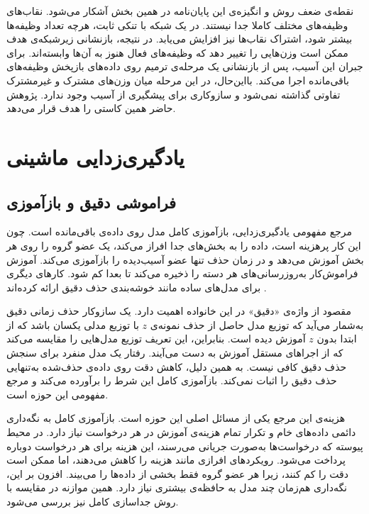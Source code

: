 نقطه‌ی ضعف روش و انگیزه‌ی این پایان‌نامه در همین بخش آشکار می‌شود. نقاب‌های وظیفه‌های مختلف کاملا جدا نیستند. در یک شبکه با تنکی ثابت، هرچه تعداد وظیفه‌ها بیشتر شود، اشتراک نقاب‌ها نیز افزایش می‌یابد. در نتیجه، بازنشانی زیرشبکه‌ی هدف ممکن است وزن‌هایی را تغییر دهد که وظیفه‌های فعال هنوز به آن‌ها وابسته‌اند.  برای جبران این آسیب، پس از بازنشانی یک مرحله‌ی ترمیم روی داده‌های بازپخش وظیفه‌های باقی‌مانده اجرا می‌کند. بااین‌حال، در این مرحله میان وزن‌های مشترک و غیرمشترک تفاوتی گذاشته نمی‌شود و سازوکاری برای پیشگیری از آسیب وجود ندارد. پژوهش حاضر همین کاستی را هدف قرار می‌دهد.

\section{یادگیری‌زدایی ماشینی}
\label{sec:lit-unlearning}

\subsection{فراموشی دقیق و بازآموزی}
\label{subsec:lit-exact}

مرجع مفهومی یادگیری‌زدایی، بازآموزی کامل مدل روی داده‌ی باقی‌مانده است. چون این کار پرهزینه است،  \cite{bourtoule2021machine} داده را به بخش‌های جدا افراز می‌کند، یک عضو گروه را روی هر بخش آموزش می‌دهد و در زمان حذف تنها عضو آسیب‌دیده را بازآموزی می‌کند. {آموزش فراموش‌کار} \cite{graves2021amnesiac} به‌روزرسانی‌های هر دسته را ذخیره می‌کند تا بعدا کم شود. کارهای دیگری برای مدل‌های ساده مانند خوشه‌بندی  حذف دقیق ارائه کرده‌اند \cite{ginart2019making}.

مقصود از واژه‌ی «دقیق» در این خانواده اهمیت دارد. یک سازوکار حذف زمانی دقیق به‌شمار می‌آید که توزیع مدل حاصل از حذف نمونه‌ی $z$ با توزیع مدلی یکسان باشد که از ابتدا بدون $z$ آموزش دیده است. بنابراین، این تعریف توزیع مدل‌هایی را مقایسه می‌کند که از اجراهای مستقل آموزش به دست می‌آیند. رفتار یک مدل منفرد برای سنجش حذف دقیق کافی نیست. به همین دلیل، کاهش دقت روی داده‌ی حذف‌شده به‌تنهایی حذف دقیق را اثبات نمی‌کند. بازآموزی کامل این شرط را برآورده می‌کند و مرجع مفهومی این حوزه است.

هزینه‌ی این مرجع یکی از مسائل اصلی این حوزه است. بازآموزی کامل به نگه‌داری دائمی داده‌های خام و تکرار تمام هزینه‌ی آموزش در هر درخواست نیاز دارد. در محیط پیوسته که درخواست‌ها به‌صورت جریانی می‌رسند، این هزینه برای هر درخواست دوباره پرداخت می‌شود. رویکردهای افرازی مانند  هزینه را کاهش می‌دهند، اما ممکن است دقت را کم کنند، زیرا هر عضو گروه فقط بخشی از داده‌ها را می‌بیند. افزون بر این، نگه‌داری هم‌زمان چند مدل به حافظه‌ی بیشتری نیاز دارد. همین موازنه در مقایسه با روش جداسازی کامل نیز بررسی می‌شود.

